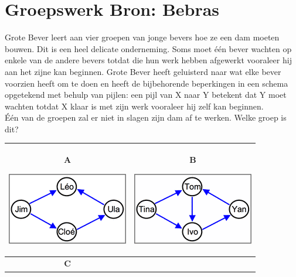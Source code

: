 \documentclass[12pt, a4paper]{article}
\begin{document}
	\begin{minipage}{\textwidth}
		\section{Groepswerk \hfill\small Bron: Bebras}
			Grote Bever leert aan vier groepen van jonge bevers hoe ze een dam moeten bouwen. Dit is een heel delicate onderneming. Soms moet \'e\'en bever wachten op enkele van de andere bevers totdat die hun werk hebben afgewerkt vooraleer hij aan het zijne kan beginnen. Grote Bever heeft geluisterd naar wat elke bever voorzien heeft om te doen en heeft de bijbehorende beperkingen in een schema opgetekend met behulp van pijlen: een pijl van X naar Y betekent dat Y moet wachten totdat X klaar is met zijn werk vooraleer hij zelf kan beginnen. \\
			
			\'E\'en van de groepen zal er niet in slagen zijn dam af te werken. Welke groep is dit?
			
			\begin{table}[H]
				\centering
				\begin{tabulary}{\linewidth}{|C|C|}
					\hline
					\textbf{A} \vspace{0.2cm}
					
					\includegraphics[width=0.9\linewidth]{option1}
					&
					\textbf{B} \vspace{0.2cm}
					
					\includegraphics[width=0.9\linewidth]{option2}
					\\ \hline
					\textbf{C} \vspace{0.2cm}
					

\end{tabulary}
\end{table}
\end{minipage}
\end{document}
